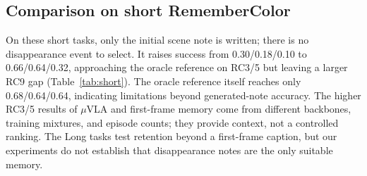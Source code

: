 \documentclass{IJCAS}
\begin{document}
\subsection{Comparison on short RememberColor}
\begin{table}[!t]
\caption{Success on the short RememberColor3/5/9-VLA tasks. Ours: one joint policy per row, 10k steps, 50 episodes per task, GPU physics. $\mu$VLA rows are taken from~\cite{muvla} (OpenVLA-OFT backbone, 100 episodes, trained on a five-task mixture that contains RC5 only, so RC3 and RC9 are held out); the MIKASA-Robo-VLA reference reports RC5 only~\cite{mikasavla}.}
\label{tab:short}
\begin{center}
{\footnotesize
\setlength{\tabcolsep}{4pt}
}
\end{center}
\end{table}
On these short tasks, only the initial scene note is written; there is no disappearance event to select.
It raises success from 0.30/0.18/0.10 to 0.66/0.64/0.32, approaching the oracle reference on RC3/5 but leaving a larger RC9 gap (Table~\ref{tab:short}).
The oracle reference itself reaches only 0.68/0.64/0.64, indicating limitations beyond generated-note accuracy.
The higher RC3/5 results of $\mu$VLA and first-frame memory come from different backbones, training mixtures, and episode counts; they provide context, not a controlled ranking.
The Long tasks test retention beyond a first-frame caption, but our experiments do not establish that disappearance notes are the only suitable memory.
\end{document}
